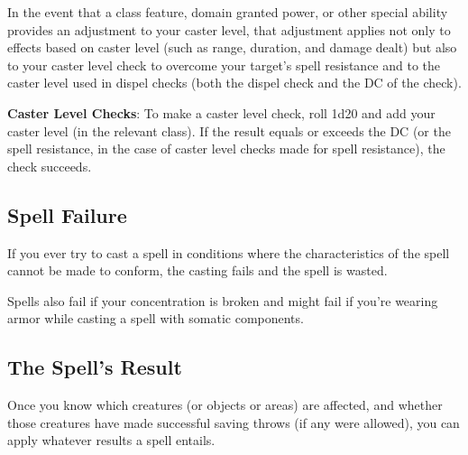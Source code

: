 In the event that a class feature, domain granted power, or other special ability provides an adjustment to your caster level, that adjustment applies not only to effects based on caster level (such as range, duration, and damage dealt) but also to your caster level check to overcome your target's spell resistance and to the caster level used in dispel checks (both the dispel check and the DC of the check).

\textbf{Caster Level Checks}: To make a caster level check, roll 1d20 and add your caster level (in the relevant class). If the result equals or exceeds the DC (or the spell resistance, in the case of caster level checks made for spell resistance), the check succeeds.

\subsection{Spell Failure}
If you ever try to cast a spell in conditions where the characteristics of the spell cannot be made to conform, the casting fails and the spell is wasted.

Spells also fail if your concentration is broken and might fail if you're wearing armor while casting a spell with somatic components.

\subsection{The Spell's Result}
Once you know which creatures (or objects or areas) are affected, and whether those creatures have made successful saving throws (if any were allowed), you can apply whatever results a spell entails.


